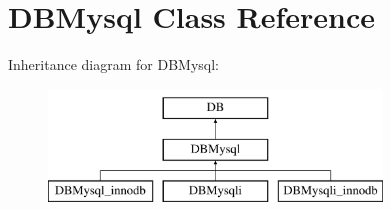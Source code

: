 \hypertarget{classDBMysql}{\section{D\-B\-Mysql Class Reference}
\label{classDBMysql}
}
Inheritance diagram for D\-B\-Mysql\-:\begin{figure}[H]
\begin{center}
\leavevmode
\includegraphics[height=3.000000cm]{classDBMysql}
\end{center}
\end{figure}

